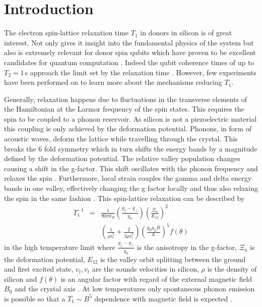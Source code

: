 \documentclass[%
 reprint,
 amsmath,amssymb,
 aps,
]{revtex4-1}
\begin{document}
\maketitle


\section{\label{sec:introduction}Introduction}

The electron spin-lattice relaxation time $T_1$ in donors in silicon is of great interest. Not only gives it insight into the fundamental physics of the system but also is extremely relevant for donor spin qubits which have proven to be excellent candidates for quantum computation \cite{Muhonen2014, Muhonen2015}. Indeed the qubit coherence times of up to $T_2=1\,$s approach the limit set by the relaxation time \cite{Kalra2016}. However, few experiments have been performed on to learn more about the mechanisms reducing $T_1$. 

Generally, relaxation happens due to fluctuations in the transverse elements of the Hamiltonian at the Larmor frequency of the spin states. This requires the spin to be coupled to a phonon reservoir.
As silicon is not a piezoelectric material this coupling is only achieved by the deformation potential. Phonons, in form of acoustic waves, deform the lattice while travelling through the crystal. This breaks the 6 fold symmetry which in turn shifts the energy bands by a  magnitude defined by the deformation potential. The relative valley population changes causing a shift in the g-factor. This shift oscillates with the phonon frequency and relaxes the spin \cite{Hasegawa1960}. Furthermore, local strain couples the gamma and delta energy bands in one valley, effectively changing the g factor locally and thus also relaxing the spin in the same fashion \cite{Roth1960}. 
This spin-lattice relaxation can be described by 
\begin{eqnarray}\label{eq:fullT1}
T_1^{-1} & = & \frac{1}{90\pi k_B}\left(\frac{g_{||}-g_\perp}{g_0}\right)\left(\frac{\Xi_u}{E_{12}}\right)^2\\
& &\left(\frac{1}{\rho \bar{v}_t^5}+\frac{2}{3\rho\bar{v}_l^5}\right)\left(\frac{g_0\mu_0B}{\hbar}\right)^5f(\theta)
\end{eqnarray}
in the high temperature limit where $\frac{g_{||}-g_\perp}{g_0}$ is the anisotropy in the g-factor, $\Xi_u$ is the deformation potential, $E_{12}$ is the valley orbit splitting between the ground and first excited state, $v_l, v_t$ are the sounds velocities in silicon, $\rho$ is the density of silicon and $f(\theta)$ is an angular factor with regard of the external magnetic field $B_0$ and the crystal axis \cite{Wilson1961}.
At low temperatures only spontaneous phonon emission is possible so that a $T_1\sim B^5$ dependence with magnetic field is expected \cite{Morello2010, Zwanenburg2013}. 
\end{document}
